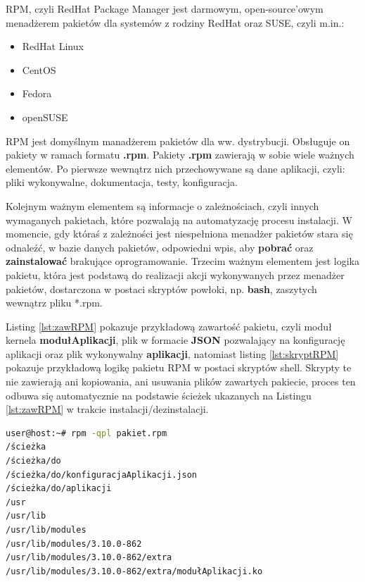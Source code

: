 \newpage
RPM, czyli RedHat Package Manager jest darmowym, open-source'owym menadżerem pakietów dla systemów z rodziny RedHat oraz SUSE, czyli m.in.:
\begin{itemize}
\item RedHat Linux
\item CentOS
\item Fedora
\item openSUSE
\end{itemize}\par
RPM jest domyślnym manadżerem pakietów dla ww. dystrybucji. Obsługuje on pakiety w ramach formatu \textbf{.rpm}. Pakiety \textbf{.rpm} zawierają w sobie wiele ważnych elementów. Po pierwsze wewnątrz nich przechowywane są dane aplikacji, czyli: pliki wykonywalne, dokumentacja, testy, konfiguracja.\par 
Kolejnym ważnym elementem są informacje o zależnościach, czyli innych wymaganych pakietach, które pozwalają na automatyzację procesu instalacji. W momencie, gdy któraś z zależności jest niespełniona menadżer pakietów stara się odnaleźć, w bazie danych pakietów, odpowiedni wpis, aby \textbf{pobrać} oraz \textbf{zainstalować} brakujące oprogramowanie. Trzecim ważnym elementem jest logika pakietu, która jest podstawą do realizacji akcji wykonywanych przez menadżer pakietów, dostarczona w postaci skryptów powłoki, np. \textbf{bash}, zaszytych wewnątrz pliku *.rpm.

Listing \ref{lst:zawRPM} pokazuje przykładową zawartość pakietu, czyli moduł kernela \textbf{modułAplikacji}, plik w formacie \textbf{JSON} pozwalający na konfigurację aplikacji oraz plik wykonywalny \textbf{aplikacji}, natomiast  listing \ref{lst:skryptRPM} pokazuje przykładową logikę pakietu RPM w postaci skryptów shell. Skrypty te nie zawierają ani kopiowania, ani usuwania plików zawartych pakiecie, proces ten odbuwa się automatycznie na podstawie ścieżek ukazanych na Listingu \ref{lst:zawRPM} w trakcie instalacji/dezinstalacji.

\begin{lstlisting}[language=bash,caption={Przykładowa zawartość pakietu RPM},label={lst:zawRPM}]
user@host:~# rpm -qpl pakiet.rpm
/ścieżka
/ścieżka/do
/ścieżka/do/konfiguracjaAplikacji.json
/ścieżka/do/aplikacji
/usr
/usr/lib
/usr/lib/modules
/usr/lib/modules/3.10.0-862
/usr/lib/modules/3.10.0-862/extra
/usr/lib/modules/3.10.0-862/extra/modułAplikacji.ko
\end{lstlisting}

\newpage

